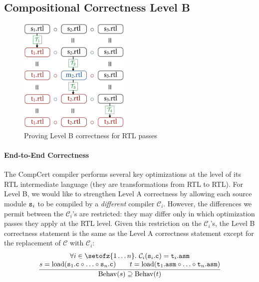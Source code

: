 \subsection{Compositional Correctness Level B}
\label{sec:overview:LevelB}

\begin{figure}[!t]
\begin{center}
\includegraphics[width=200px]{sepcomp-levelb.png}
\end{center}
\caption{Proving Level B correctness for RTL passes}
\label{fig:LevelB}
\end{figure}

\paragraph{End-to-End Correctness}

The CompCert compiler performs several key optimizations at the level
of its RTL intermediate language (\ie they are transformations from
RTL to RTL).  For Level B, we would like to strengthen Level A
correctness by allowing each source module $\mathtt{s}_{i}$ to be compiled by
a \emph{different} compiler $\mathcal{C}_i$.  However, the differences
we permit between the $\mathcal{C}_i$'s are restricted: they may
differ only in which optimization passes they apply at the RTL level.
Given this restriction on the $\mathcal{C}_i$'s, the Level B
correctness statement is the same as the Level A correctness statement
except for the replacement of $\mathcal{C}$ with $\mathcal{C}_i$:
\[
\frac{
\begin{array}{@{}c@{}}
\forall i\in\setofz{1\ldots n}.~\mathcal{C}_i(\mathtt{s}_i\mathtt{.c}) = \mathtt{t}_i\mathtt{.asm} \\
s = \mathrm{load}(\mathtt{s}_1\mathtt{.c}\circ \ldots \circ \mathtt{s}_n\mathtt{.c})\qquad
t = \mathrm{load}(\mathtt{t}_1\mathtt{.asm}\circ \ldots \circ \mathtt{t}_n\mathtt{.asm})
\end{array}
}
{
\mathrm{Behav}(s) 
\supseteq \mathrm{Behav}(t)
}
\]

